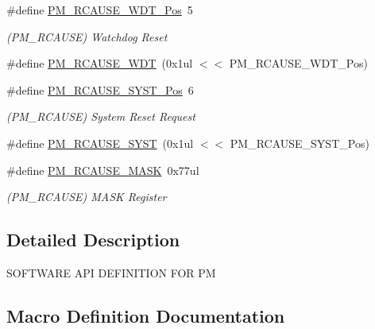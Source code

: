 \begin{DoxyCompactItemize}
\item 
\#define \mbox{\hyperlink{group___s_a_m_d21___p_m_gab0963293947ca8a4531e5a51d53438b2}{P\+M\+\_\+\+R\+C\+A\+U\+S\+E\+\_\+\+W\+D\+T\+\_\+\+Pos}}~5
\begin{DoxyCompactList}\small\item\em (P\+M\+\_\+\+R\+C\+A\+U\+SE) Watchdog Reset \end{DoxyCompactList}\item 
\#define \mbox{\hyperlink{group___s_a_m_d21___p_m_ga2e6ddb881722d01467601fe471f3d39d}{P\+M\+\_\+\+R\+C\+A\+U\+S\+E\+\_\+\+W\+DT}}~(0x1ul $<$$<$ P\+M\+\_\+\+R\+C\+A\+U\+S\+E\+\_\+\+W\+D\+T\+\_\+\+Pos)
\item 
\#define \mbox{\hyperlink{group___s_a_m_d21___p_m_ga98bccf88ebbe8c585894d0d59c9d2eb8}{P\+M\+\_\+\+R\+C\+A\+U\+S\+E\+\_\+\+S\+Y\+S\+T\+\_\+\+Pos}}~6
\begin{DoxyCompactList}\small\item\em (P\+M\+\_\+\+R\+C\+A\+U\+SE) System Reset Request \end{DoxyCompactList}\item 
\#define \mbox{\hyperlink{group___s_a_m_d21___p_m_ga29b98dbafb252924fad96c9e668bf003}{P\+M\+\_\+\+R\+C\+A\+U\+S\+E\+\_\+\+S\+Y\+ST}}~(0x1ul $<$$<$ P\+M\+\_\+\+R\+C\+A\+U\+S\+E\+\_\+\+S\+Y\+S\+T\+\_\+\+Pos)
\item 
\#define \mbox{\hyperlink{group___s_a_m_d21___p_m_ga05323087160d74c5942d3df083536095}{P\+M\+\_\+\+R\+C\+A\+U\+S\+E\+\_\+\+M\+A\+SK}}~0x77ul
\begin{DoxyCompactList}\small\item\em (P\+M\+\_\+\+R\+C\+A\+U\+SE) M\+A\+SK Register \end{DoxyCompactList}\end{DoxyCompactItemize}


\subsection{Detailed Description}
S\+O\+F\+T\+W\+A\+RE A\+PI D\+E\+F\+I\+N\+I\+T\+I\+ON F\+OR PM 

\subsection{Macro Definition Documentation}
\mbox{\label{group___s_a_m_d21___p_m_gae9a2f629d7dde97e11db3ad076772b55}} 
